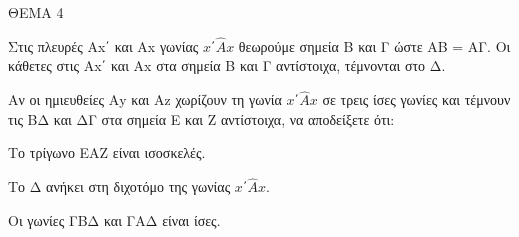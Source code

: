 
ΘΕΜΑ 4

Στις πλευρές Αx΄ και Αx γωνίας $x΄\widehat{Α}x$ θεωρούμε σημεία Β και Γ ώστε ΑΒ = ΑΓ. Οι κάθετες στις Αx΄ και Αx στα σημεία Β και Γ αντίστοιχα, τέμνονται στο Δ.

Αν οι ημιευθείες Αy και Αz χωρίζουν τη γωνία $x΄\widehat{Α}x$ σε τρεις ίσες γωνίες και τέμνουν τις ΒΔ και ΔΓ στα σημεία Ε και Ζ αντίστοιχα, να αποδείξετε ότι:

\begin{alist}
\item Το τρίγωνο ΕΑΖ είναι ισοσκελές. 

\item Το Δ ανήκει στη διχοτόμο της γωνίας $x΄\widehat{Α}x$. 

\item Οι γωνίες ΓΒΔ και ΓΑΔ είναι ίσες. 


\end{alist}
